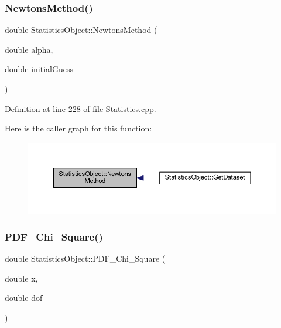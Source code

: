 \subsubsection{\texorpdfstring{Newtons\+Method()}{NewtonsMethod()}}
{\footnotesize\ttfamily double Statistics\+Object\+::\+Newtons\+Method (\begin{DoxyParamCaption}\item[{double}]{alpha,  }\item[{double}]{initial\+Guess }\end{DoxyParamCaption})\hspace{0.3cm}{\ttfamily [protected]}}



Definition at line 228 of file Statistics.\+cpp.

Here is the caller graph for this function\+:\nopagebreak
\begin{figure}[H]
\begin{center}
\leavevmode
\includegraphics[width=350pt]{class_statistics_object_ade153b4af992cc1df2c515cde8e01ef9_icgraph}
\end{center}
\end{figure}
\mbox{\label{class_statistics_object_aec6848499139f4811fd4f2f60a252a9f}} 
\subsubsection{\texorpdfstring{P\+D\+F\+\_\+\+Chi\+\_\+\+Square()}{PDF\_Chi\_Square()}}
{\footnotesize\ttfamily double Statistics\+Object\+::\+P\+D\+F\+\_\+\+Chi\+\_\+\+Square (\begin{DoxyParamCaption}\item[{double}]{x,  }\item[{double}]{dof }\end{DoxyParamCaption})}



